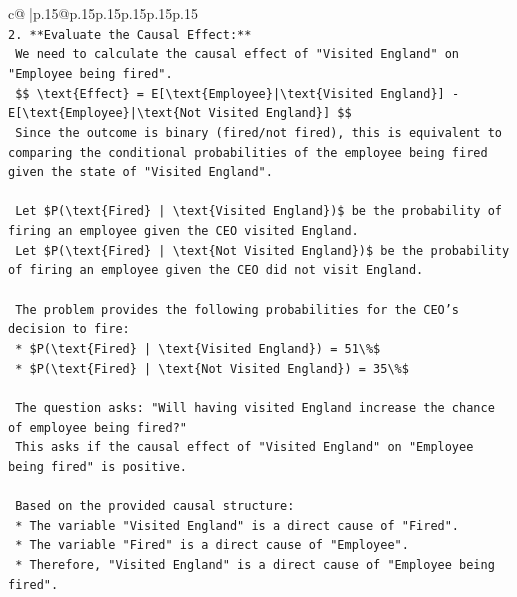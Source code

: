 \documentclass{article}
\begin{document}
{\begin{supertabular}{c@{$\;$}|p{.15\linewidth}@{}p{.15\linewidth}p{.15\linewidth}p{.15\linewidth}p{.15\linewidth}p{.15\linewidth}}
{{{\\ 
\texttt{2.  **Evaluate the Causal Effect:**} \\
\texttt{    We need to calculate the causal effect of "Visited England" on "Employee being fired".} \\
\texttt{    \$\$ \textbackslash{}text\{Effect\} = E{[}\textbackslash{}text\{Employee\}|\textbackslash{}text\{Visited England\}{]} {-} E{[}\textbackslash{}text\{Employee\}|\textbackslash{}text\{Not Visited England\}{]} \$\$} \\
\texttt{    Since the outcome is binary (fired/not fired), this is equivalent to comparing the conditional probabilities of the employee being fired given the state of "Visited England".} \\
\\ 
\texttt{    Let \$P(\textbackslash{}text\{Fired\} | \textbackslash{}text\{Visited England\})\$ be the probability of firing an employee given the CEO visited England.} \\
\texttt{    Let \$P(\textbackslash{}text\{Fired\} | \textbackslash{}text\{Not Visited England\})\$ be the probability of firing an employee given the CEO did not visit England.} \\
\\ 
\texttt{    The problem provides the following probabilities for the CEO's decision to fire:} \\
\texttt{    *   \$P(\textbackslash{}text\{Fired\} | \textbackslash{}text\{Visited England\}) = 51\textbackslash{}\%\$} \\
\texttt{    *   \$P(\textbackslash{}text\{Fired\} | \textbackslash{}text\{Not Visited England\}) = 35\textbackslash{}\%\$} \\
\\ 
\texttt{    The question asks: "Will having visited England increase the chance of employee being fired?"} \\
\texttt{    This asks if the causal effect of "Visited England" on "Employee being fired" is positive.} \\
\\ 
\texttt{    Based on the provided causal structure:} \\
\texttt{    *   The variable "Visited England" is a direct cause of "Fired".} \\
\texttt{    *   The variable "Fired" is a direct cause of "Employee".} \\
\texttt{    *   Therefore, "Visited England" is a direct cause of "Employee being fired".} \\
}}}
\end{supertabular}}
\end{document}
